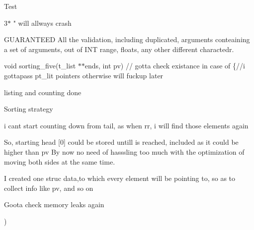 Test

3$\ast$ "{} will allways crash

GUARANTEED All the validation, including duplicated, arguments conteaining a set of arguments, out of INT range, floats, any other different charactedr.

 void sorting\+\_\+five(t\+\_\+list $\ast$$\ast$ends, int pv) // gotta check existance in case of \{//i gottapass pt\+\_\+lit pointers otherwise will fuckup later

listing and counting done

Sorting strategy

i cant start counting down from tail, as when rr, i will find those elements again

So, starting head \mbox{[}0\mbox{]} could be stored untill is reached, included as it could be higher than pv By now no need of hasssling too much with the optimization of moving both sides at the same time.

I created one struc data,to which every element will be pointing to, so as to collect info like pv, and so on

Goota check memory leaks again

) 